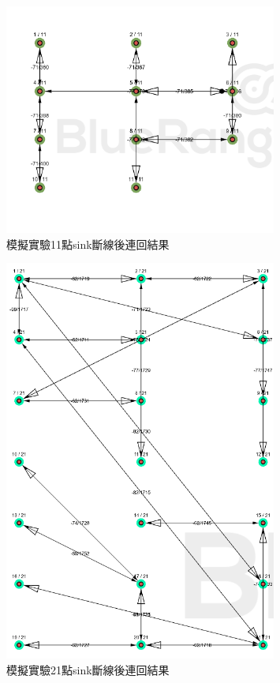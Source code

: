 \begin{ZhChapter}
\begin{figure}[H]
    \centering
    \includegraphics[width = 0.8\textwidth]{image/模擬實驗11點sink斷線後連回.png}
    \caption{模擬實驗11點sink斷線後連回結果}
    \label{fig: 模擬實驗11點sink斷線後連回}
\end{figure}

\begin{figure}[H]
    \centering
    \includegraphics[width = 0.8\textwidth]{image/模擬實驗21點sink斷線後連回.png}
    \caption{模擬實驗21點sink斷線後連回結果}
    \label{fig: 模擬實驗21點sink斷線後連回}
\end{figure}


\end{ZhChapter}
